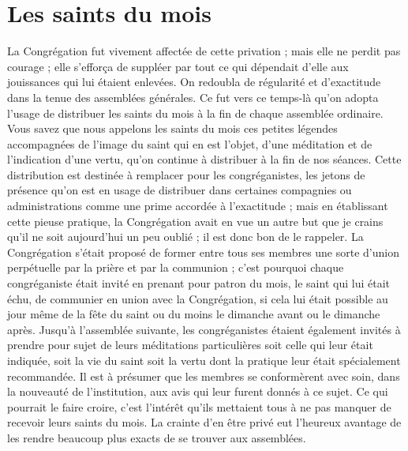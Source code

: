 \section*{Les saints du mois}
La Congrégation fut vivement affectée de cette privation ; mais elle ne perdit pas courage ; elle s'efforça de suppléer par tout ce qui dépendait d'elle aux jouissances qui lui étaient enlevées. On redoubla de régularité et d'exactitude dans la tenue des assemblées générales. Ce fut vers ce temps-là qu'on adopta l'usage de distribuer
les saints du mois à la fin de chaque assemblée ordinaire. Vous savez que nous appelons les saints du mois ces petites légendes accompagnées de l'image du saint qui en est l'objet, d'une méditation et de l'indication d'une vertu, qu'on continue à distribuer à la fin de nos séances. Cette distribution est destinée à remplacer pour les congréganistes, les jetons de présence qu'on est en usage de distribuer dans certaines compagnies ou administrations comme une prime accordée à l'exactitude ; mais en établissant cette pieuse pratique, la Congrégation avait en vue un autre but que je crains qu'il ne soit aujourd'hui un peu oublié ; il est donc bon de le rappeler. La Congrégation s'était proposé de former entre tous ses membres une sorte d'union perpétuelle par la prière et par la communion ; c'est pourquoi chaque congréganiste était invité en prenant pour patron du mois, le saint qui lui était échu, de communier en union avec la Congrégation, si cela lui était possible au jour même de la fête du saint ou du moins le dimanche avant ou le dimanche après. Jusqu'à l'assemblée suivante, les congréganistes étaient également invités à prendre pour sujet de leurs méditations particulières soit celle qui leur était indiquée, soit la vie du saint soit la vertu dont la pratique leur était spécialement recommandée. Il est à présumer que les membres se conformèrent avec soin, dans la nouveauté de l'institution, aux avis qui leur furent donnés à ce sujet. Ce qui pourrait le faire croire, c'est l'intérêt qu'ils mettaient tous à ne pas manquer de recevoir leurs saints du mois. La crainte d'en être privé eut l'heureux avantage de les rendre beaucoup plus exacts de se trouver aux assemblées.

